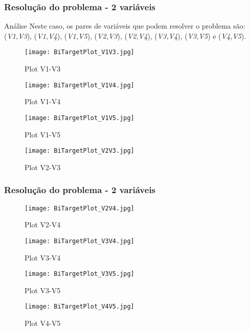 \begin{frame}[shrink=30]
    \frametitle{Resolução do problema - 2 variáveis}

    \begin{block}{Análise}
        Neste caso, os pares de variáveis que podem resolver o problema são: 
        (\textit{V1,V3}), (\textit{V1,V4}), (\textit{V1,V5}), (\textit{V2,V3}), (\textit{V2,V4}), (\textit{V3,V4}), (\textit{V3,V5}) e (\textit{V4,V5}).
    \end{block}
     \begin{figure}[!tbp]
        \centering
        \begin{minipage}[b]{0.3\textwidth}
            \texttt{[image: BiTargetPlot\_V1V3.jpg]}
            \caption{Plot V1-V3}
        \end{minipage}
        \begin{minipage}[b]{0.3\textwidth}
            \texttt{[image: BiTargetPlot\_V1V4.jpg]}
            \caption{Plot V1-V4}
        \end{minipage}
        \begin{minipage}[b]{0.3\textwidth}
            \texttt{[image: BiTargetPlot\_V1V5.jpg]}
            \caption{Plot V1-V5}
        \end{minipage}
        \begin{minipage}[b]{0.3\textwidth}
            \texttt{[image: BiTargetPlot\_V2V3.jpg]}
            \caption{Plot V2-V3}
        \end{minipage}
    \end{figure}
    
\end{frame}

\begin{frame}[shrink=30]
    \frametitle{Resolução do problema - 2 variáveis}

     \begin{figure}[!tbp]
        \centering
       
        \begin{minipage}[b]{0.3\textwidth}
            \texttt{[image: BiTargetPlot\_V2V4.jpg]}
            \caption{Plot V2-V4}
        \end{minipage}
        \begin{minipage}[b]{0.3\textwidth}
            \texttt{[image: BiTargetPlot\_V3V4.jpg]}
            \caption{Plot V3-V4}
        \end{minipage}
        \begin{minipage}[b]{0.3\textwidth}
            \texttt{[image: BiTargetPlot\_V3V5.jpg]}
            \caption{Plot V3-V5}
        \end{minipage}
        \begin{minipage}[b]{0.3\textwidth}
            \texttt{[image: BiTargetPlot\_V4V5.jpg]}
            \caption{Plot V4-V5}
        \end{minipage}
        
    \end{figure}
    
\end{frame}



